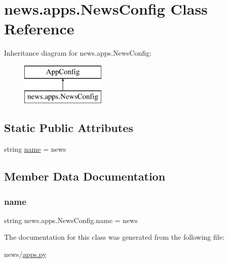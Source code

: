 \hypertarget{classnews_1_1apps_1_1_news_config}{}\section{news.\+apps.\+News\+Config Class Reference}
\label{classnews_1_1apps_1_1_news_config}
Inheritance diagram for news.\+apps.\+News\+Config\+:\begin{figure}[H]
\begin{center}
\leavevmode
\includegraphics[height=2.000000cm]{classnews_1_1apps_1_1_news_config}
\end{center}
\end{figure}
\subsection*{Static Public Attributes}
\begin{DoxyCompactItemize}
\item 
string \mbox{\hyperlink{classnews_1_1apps_1_1_news_config_a76565ed0ccd338b3e149ea11b729f1c0}{name}} = \textquotesingle{}news\textquotesingle{}
\end{DoxyCompactItemize}


\subsection{Member Data Documentation}
\mbox{\label{classnews_1_1apps_1_1_news_config_a76565ed0ccd338b3e149ea11b729f1c0}} 
\subsubsection{\texorpdfstring{name}{name}}
{\footnotesize\ttfamily string news.\+apps.\+News\+Config.\+name = \textquotesingle{}news\textquotesingle{}\hspace{0.3cm}{\ttfamily [static]}}



The documentation for this class was generated from the following file\+:\begin{DoxyCompactItemize}
\item 
news/\mbox{\hyperlink{apps_8py}{apps.\+py}}\end{DoxyCompactItemize}

